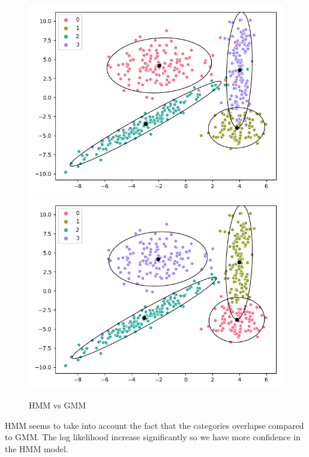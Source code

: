 \documentclass[a4paper]{article}
\begin{document}
\begin{figure}[h]

\begin{minipage}{0,95\textwidth}
\caption{HMM vs GMM}
\includegraphics[scale=.40]{train.png}
\includegraphics[scale=.40]{em_general.png}
\end{minipage}
\end{figure}

HMM seems to take into account the fact that the categories overlapse compared to GMM. The log likelihood increase significantly so we have more confidence in the HMM model.
\end{document}
